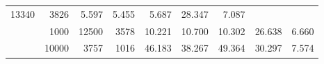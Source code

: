 \begin{table}
\begin{tabular}{rrrrrrrrr}
							     13340  & 3826  
	                           & 5.597 & 5.455 & 5.687
	                           & 28.347 & 7.087  \\
	                
	            
					 &  
					 
					\multirow{ 1 }{*}{ 1000 } &
					
						
							    
							     12500  & 3578  
	                           & 10.221 & 10.700 & 10.302
	                           & 26.638 & 6.660  \\
	                
	            
					 &  
					 
					\multirow{ 1 }{*}{ 10000 } &
					
						
							    
							     3757  & 1016  
	                           & 46.183 & 38.267 & 49.364
	                           & 30.297 & 7.574  \\
	                
	            
	        

\hline

\end{tabular}
\end{table}
\clearpage


	    

